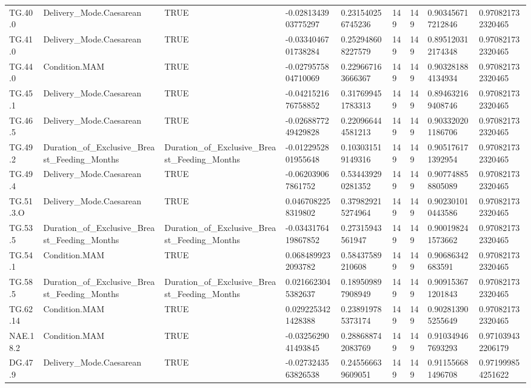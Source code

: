 \begin{longtable}{lllllllll}
TG.40.0 & Delivery\_Mode.Caesarean & TRUE & -0.0281343903775297 & 0.231540256745236 & 149 & 149 & 0.903456717212846 & 0.970821732320465 \\
TG.41.0 & Delivery\_Mode.Caesarean & TRUE & -0.0334046701738284 & 0.252948608227579 & 149 & 149 & 0.895120312174348 & 0.970821732320465 \\
TG.44.0 & Condition.MAM & TRUE & -0.0279575804710069 & 0.229667163666367 & 149 & 149 & 0.903281884134934 & 0.970821732320465 \\
TG.45.1 & Delivery\_Mode.Caesarean & TRUE & -0.0421521676758852 & 0.317699451783313 & 149 & 149 & 0.894632169408746 & 0.970821732320465 \\
TG.46.5 & Delivery\_Mode.Caesarean & TRUE & -0.0268877249429828 & 0.220966444581213 & 149 & 149 & 0.903320201186706 & 0.970821732320465 \\
TG.49.2 & Duration\_of\_Exclusive\_Breast\_Feeding\_Months & Duration\_of\_Exclusive\_Breast\_Feeding\_Months & -0.0122952801955648 & 0.103031519149316 & 149 & 149 & 0.905176171392954 & 0.970821732320465 \\
TG.49.4 & Delivery\_Mode.Caesarean & TRUE & -0.062039067861752 & 0.534439290281352 & 149 & 149 & 0.907748858805089 & 0.970821732320465 \\
TG.51.3.O & Delivery\_Mode.Caesarean & TRUE & 0.0467082258319802 & 0.379829215274964 & 149 & 149 & 0.902301010443586 & 0.970821732320465 \\
TG.53.5 & Duration\_of\_Exclusive\_Breast\_Feeding\_Months & Duration\_of\_Exclusive\_Breast\_Feeding\_Months & -0.0343176419867852 & 0.27315943561947 & 149 & 149 & 0.900198241573662 & 0.970821732320465 \\
TG.54.1 & Condition.MAM & TRUE & 0.0684899232093782 & 0.58437589210608 & 149 & 149 & 0.90686342683591 & 0.970821732320465 \\
TG.58.5 & Duration\_of\_Exclusive\_Breast\_Feeding\_Months & Duration\_of\_Exclusive\_Breast\_Feeding\_Months & 0.0216623045382637 & 0.189509897908949 & 149 & 149 & 0.909153671201843 & 0.970821732320465 \\
TG.62.14 & Condition.MAM & TRUE & 0.0292253421428388 & 0.238919785373174 & 149 & 149 & 0.902813905255649 & 0.970821732320465 \\
NAE.18.2 & Condition.MAM & TRUE & -0.0325629041493845 & 0.288688742083769 & 149 & 149 & 0.910349467693293 & 0.971039432206179 \\
DG.47.9 & Delivery\_Mode.Caesarean & TRUE & -0.0273243563826538 & 0.245566639609051 & 149 & 149 & 0.911556681496708 & 0.971999854251622 \\

\end{longtable}
